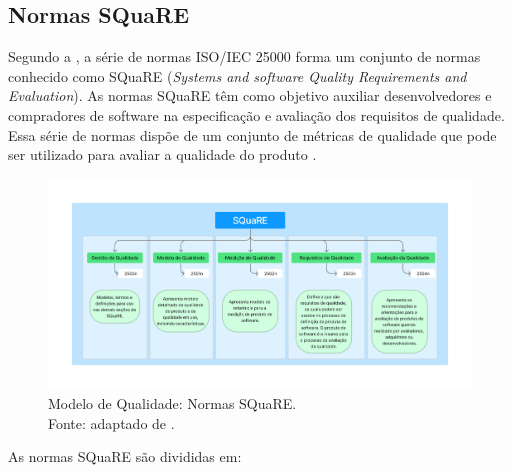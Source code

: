 \subsection{Normas SQuaRE}
Segundo a , a série de normas ISO/IEC 25000 forma um conjunto de normas conhecido como SQuaRE (\textit{Systems and software Quality Requirements and Evaluation}).
As normas SQuaRE têm como objetivo auxiliar desenvolvedores e compradores de software na especificação e avaliação dos requisitos de qualidade. Essa série de normas dispõe de um conjunto de métricas de qualidade que pode ser utilizado para avaliar a qualidade do produto .
\vspace{-20pt}
\begin{figure}[H]
    \centering
    \includegraphics[width=1.0\textwidth]{figuras/square_board.pdf}
    \vspace{-40pt}
    \caption{Modelo de Qualidade: Normas SQuaRE.\\
    Fonte: adaptado de .}
    \label{fig:qualidade-produto}
\end{figure}

As normas SQuaRE são divididas em:

